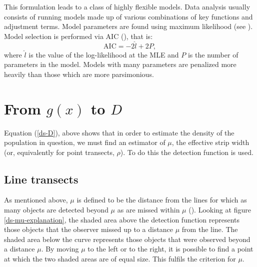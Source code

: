 This formulation leads to a class of highly flexible models. Data analysis usually consists of running models made up of various combinations of key functions and adjustment terms. Model parameters are found using maximum likelihood (see ). Model selection is performed via AIC (\cite[p. 69]{IDS}), that is:
\begin{equation}
\text{AIC} = -2 \hat{l} + 2P,
\label{DEFN-AIC}
\end{equation}
where $\hat{l}$ is the value of the log-likelihood at the MLE and $P$ is the number of parameters in the model. Models with many parameters are penalized more heavily than those which are more parsimonious.\label{cor-5s8}

\section{From $g(x)$ to $D$}
\label{gtoD}
Equation (\ref{ds-D}), above shows that in order to estimate the density of the population in question, we must find an estimator of $\mu$, the effective strip width (or, equivalently for point transects, $\rho$). To do this the detection function is used.

\subsection{Line transects} 
As mentioned above, $\mu$ is defined to be the distance from the lines for which as many objects are detected beyond $\mu$ as are missed within $\mu$ (\cite{eenviron}). Looking at figure \ref{ds-mu-explanation}, the shaded area above the detection function represents those objects that the observer missed up to a distance $\mu$ from the line. The shaded area below the curve represents those objects that were observed beyond a distance $\mu$. By moving $\mu$ to the left or to the right, it is possible to find a point at which the two shaded areas are of equal size. This fulfils the criterion for $\mu$.

